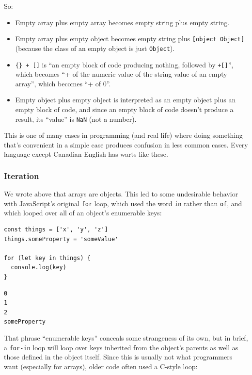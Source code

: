 So:

\begin{itemize}
\tightlist
\item
  Empty array plus empty array becomes empty string plus empty string.
\item
  Empty array plus empty object becomes empty string plus
  \texttt{{[}object\ Object{]}} (because the class of an empty object is
  just \texttt{Object}).
\item
  \texttt{\{\}\ +\ {[}{]}} is ``an empty block of code producing
  nothing, followed by \texttt{+{[}{]}}'', which becomes ``+ of the
  numeric value of the string value of an empty array'', which becomes
  ``+ of 0''.
\item
  Empty object plus empty object is interpreted as an empty object plus
  an empty block of code, and since an empty block of code doesn't
  produce a result, its ``value'' is \texttt{NaN} (not a number).
\end{itemize}

This is one of many cases in programming (and real life) where doing
something that's convenient in a simple case produces confusion in less
common cases. Every language except Canadian English has warts like
these.

\hypertarget{s:legacy-iteration}{\subsubsection{Iteration}\label{s:legacy-iteration}}

We wrote above that arrays are objects. This led to some undesirable
behavior with JavaScript's original \texttt{for} loop, which used the
word \texttt{in} rather than \texttt{of}, and which looped over all of
an object's enumerable keys:

\begin{verbatim}
const things = ['x', 'y', 'z']
things.someProperty = 'someValue'

for (let key in things) {
  console.log(key)
}
\end{verbatim}

\begin{verbatim}
0
1
2
someProperty
\end{verbatim}

That phrase ``enumerable keys'' conceals some strangeness of its own,
but in brief, a \texttt{for-in} loop will loop over keys inherited from
the object's parents as well as those defined in the object itself.
Since this is usually not what programmers want (especially for arrays),
older code often used a C-style loop:

